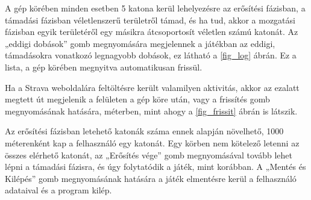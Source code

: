 

A gép körében minden esetben 5 katona kerül lehelyezésre az erősítési fázisban, a támadási fázisban véletlenszerű területről támad, és ha tud, akkor a mozgatási fázisban egyik területéről egy másikra átcsoportosít véletlen számú katonát.
Az „eddigi dobások” gomb megnyomására megjelennek a játékban az eddigi, támadásokra vonatkozó legnagyobb dobások, ez látható a \ref{fig_log} ábrán.
Ez a lista, a gép körében megnyitva automatikusan frissül. 



Ha a Strava weboldalára feltöltésre került valamilyen aktivitás, akkor az ezalatt megtett út megjelenik a felületen a gép köre után, vagy a frissítés gomb megnyomásának hatására, méterben, mint ahogy a \ref{fig_frissit} ábrán is látszik. 



Az erősítési fázisban letehető katonák száma ennek alapján növelhető, 1000 méterenként kap a felhasználó egy katonát.
Egy körben nem kötelező letenni az összes elérhető katonát, az „Erősítés vége” gomb megnyomásával tovább lehet lépni a támadási fázisra, és úgy folytatódik a játék, mint korábban. A „Mentés és Kilépés” gomb megnyomásának hatására a játék elmentésre kerül a felhasználó adataival és a program kilép.